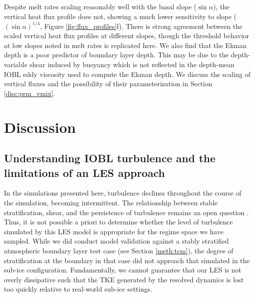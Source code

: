 \documentclass[tc, manuscript]{copernicus}
\begin{document}
Despite melt rates scaling reasonably well with the basal slope ($\sin \alpha$), the vertical heat flux profile does not, showing a much lower sensitivity to slope ($(\sin\alpha)^{1/4}$, Figure \ref{fig:flux_profiles}f). There is strong agreement between the scaled vertical heat flux profiles at different slopes, though the threshold behavior at low slopes noted in melt rates is replicated here. We also find that the Ekman depth is a poor predictor of boundary layer depth. This may be due to the depth-variable shear induced by buoyancy which is not reflected in the depth-mean IOBL eddy viscosity used to compute the Ekman depth. We discuss the scaling of vertical fluxes and the possibility of their parameterization in Section \ref{disc:prm_vmix}.


\section{Discussion}\label{disc}

\subsection{Understanding IOBL turbulence and the limitations of an LES approach} \label{disc:dyn}

In the simulations presented here, turbulence declines throughout the course of the simulation, becoming intermittent. The relationship between stable stratification, shear, and the persistence of turbulence remains an open question \citep{zonta_stably_2018}. Thus, it is not possible a priori to determine whether the level of turbulence simulated by this LES model is appropriate for the regime space we have sampled. While we did conduct model validation against a stably stratified atmospheric boundary layer test case (see Section \ref{meth:tcm}), the degree of stratification at the boundary in that case did not approach that simulated in the sub-ice configuration. Fundamentally, we cannot guarantee that our LES is not overly dissipative such that the TKE generated by the resolved dynamics is lost too quickly relative to real-world sub-ice settings. 
\end{document}
